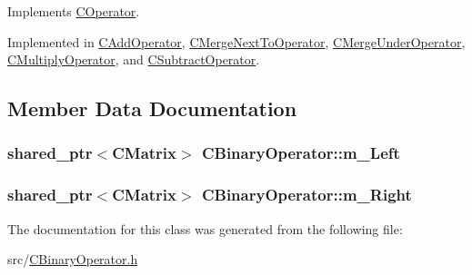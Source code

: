 Implements \hyperlink{classCOperator_a45c8237c879a44f839247badefe6eade}{C\+Operator}.



Implemented in \hyperlink{classCAddOperator_a7fb8e83b7c5831e3f2e6e8544af49523}{C\+Add\+Operator}, \hyperlink{classCMergeNextToOperator_ab914c0ae204819b6f5e9d9857acd1854}{C\+Merge\+Next\+To\+Operator}, \hyperlink{classCMergeUnderOperator_a4b17a385b3f261bd9a5ab3cb4403e9fb}{C\+Merge\+Under\+Operator}, \hyperlink{classCMultiplyOperator_a328c99de6116b51ef3aa52705a748a85}{C\+Multiply\+Operator}, and \hyperlink{classCSubtractOperator_a09c75b8486a0056f82dcec6a5f9fcc58}{C\+Subtract\+Operator}.



\subsection{Member Data Documentation}
\subsubsection[{\texorpdfstring{m\+\_\+\+Left}{m_Left}}]{\setlength{\rightskip}{0pt plus 5cm}shared\+\_\+ptr$<${\bf C\+Matrix}$>$ C\+Binary\+Operator\+::m\+\_\+\+Left\hspace{0.3cm}{\ttfamily [protected]}}\hypertarget{classCBinaryOperator_a05f24960fb48975c94b462da76aa9ad0}{}\label{classCBinaryOperator_a05f24960fb48975c94b462da76aa9ad0}
\subsubsection[{\texorpdfstring{m\+\_\+\+Right}{m_Right}}]{\setlength{\rightskip}{0pt plus 5cm}shared\+\_\+ptr$<${\bf C\+Matrix}$>$ C\+Binary\+Operator\+::m\+\_\+\+Right\hspace{0.3cm}{\ttfamily [protected]}}\hypertarget{classCBinaryOperator_a5588bc0fa7e3ca62ef3dbdb23d96f920}{}\label{classCBinaryOperator_a5588bc0fa7e3ca62ef3dbdb23d96f920}


The documentation for this class was generated from the following file\+:\begin{DoxyCompactItemize}
\item 
src/\hyperlink{CBinaryOperator_8h}{C\+Binary\+Operator.\+h}\end{DoxyCompactItemize}
